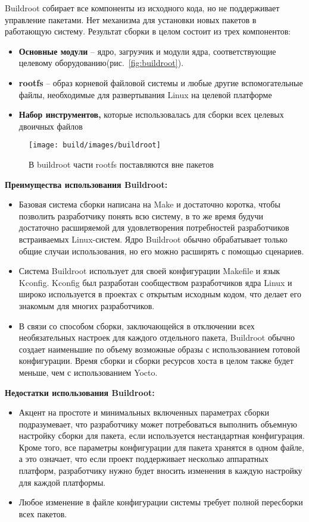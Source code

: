 Buildroot собирает все компоненты из исходного кода, но не поддерживает управление пакетами. Нет механизма для установки новых пакетов в работающую систему.
Результат сборки в целом состоит из трех компонентов:
\begin{itemize}
  \item \textbf{Основные модули} -- ядро, загрузчик и модули ядра, соответствующие целевому оборудованию(рис.~\ref{fig:buildroot}).
  \item \textbf{rootfs} -- образ корневой файловой системы и любые другие вспомогательные файлы, необходимые для развертывания Linux на целевой платформе
  \item \textbf{Набор инструментов,} которые использовалась для сборки всех целевых двоичных файлов
\end{itemize}

\begin{figure}[h!]
  \centering
  \setlength{\fboxsep}{5pt}
  \texttt{[image: build/images/buildroot]}
  \caption{В buildroot части rootfs поставляются вне пакетов}\label{fig: buildroot}
\end{figure}

\textbf{Преимущества использования Buildroot:}
\begin{itemize}
  \item Базовая система сборки написана на Make\cite{BUILDROOT} и достаточно коротка, чтобы позволить разработчику понять всю систему, в то же время будучи достаточно расширяемой для удовлетворения потребностей разработчиков встраиваемых Linux-систем. 
Ядро Buildroot обычно обрабатывает только общие случаи использования, но его можно расширять с помощью сценариев.
  \item Система Buildroot использует для своей конфигурации Makefile и язык Kconfig\cite{BUILDROOT}. Kconfig был разработан сообществом разработчиков ядра Linux\cite{KCONFIG} и широко используется в проектах с открытым исходным кодом, что делает его знакомым для многих разработчиков.
  \item В связи со способом сборки, заключающейся в отключении всех необязательных настроек для каждого отдельного пакета, Buildroot обычно создает наименьшие по объему возможные образы с использованием готовой конфигурации. 
Время сборки и сборки ресурсов хоста в целом также будет меньше, чем с использованием Yocto.
\end{itemize}
\textbf{Недостатки использования Buildroot:}
\begin{itemize}
  \item Акцент на простоте и минимальных включенных параметрах сборки подразумевает, что разработчику может потребоваться выполнить объемную настройку сборки для пакета, если используется нестандартная конфигурация. Кроме того, все параметры конфигурации для пакета хранятся в одном файле\cite{BUILDROOT}, а это означает, что если проект поддерживает несколько аппаратных платформ, разработчику нужно будет вносить изменения в каждую настройку для каждой платформы.
  \item Любое изменение в файле конфигурации системы требует полной пересборки всех пакетов.
\end{itemize}

